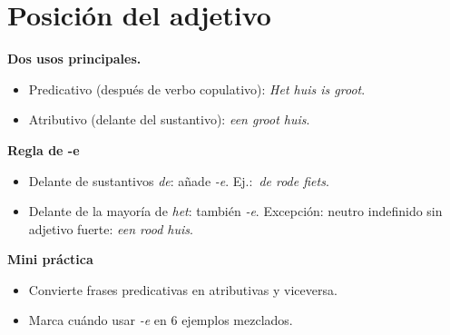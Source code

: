 \section{Posición del adjetivo}
\textbf{Dos usos principales.}
\begin{itemize}[leftmargin=*]
  \item Predicativo (después de verbo copulativo): \textit{Het huis is groot}.
  \item Atributivo (delante del sustantivo): \textit{een groot huis}.
\end{itemize}

\textbf{Regla de -e}
\begin{itemize}[leftmargin=*]
  \item Delante de sustantivos \textit{de}: añade \textit{-e}. Ej.:\ \textit{de rode fiets}.
  \item Delante de la mayoría de \textit{het}: también \textit{-e}. Excepción: neutro indefinido sin adjetivo fuerte: \textit{een rood huis}.
\end{itemize}

\textbf{Mini práctica}
\begin{itemize}[leftmargin=*]
  \item Convierte frases predicativas en atributivas y viceversa.
  \item Marca cuándo usar \textit{-e} en 6 ejemplos mezclados.
\end{itemize}
